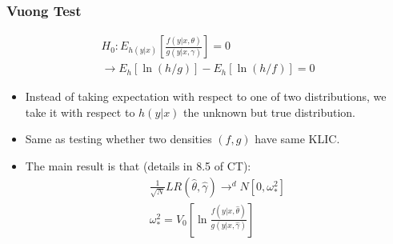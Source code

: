 \begin{frame}
\frametitle{Vuong Test}
\begin{eqnarray*}
H_0: E_{h(y|x)} \left[ \frac{ f(y | x,\theta) }{g(y | x, \gamma)} \right] = 0  \\
\rightarrow E_h[\ln(h/g)] - E_h[\ln (h/f)] = 0
\end{eqnarray*}
\begin{itemize}
\item Instead of taking expectation with respect to one of two distributions, we take it with respect to $h(y |x)$ the unknown but \alert{true distribution}.
\item Same as testing whether two densities $(f,g)$ have same KLIC.
\item The main result is that (details in 8.5 of CT):
\begin{eqnarray*}
\frac{1}{\sqrt{N}} LR(\hat{\theta},\hat{\gamma}) \rightarrow^d N [0,\omega_{*}^2]\\
\omega_{*}^2 =  V_0 \left[ \ln \frac{f(y| x, \hat{\theta})}{g(y| x, \hat{\gamma})}  \right]
\end{eqnarray*}
\end{itemize}
\end{frame}


